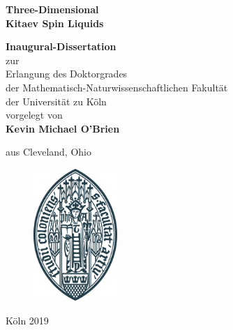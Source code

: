 \documentclass[11pt, a4paper]{article}
\begin{document}
\begin{titlepage}

	\vspace*{\fill}
	\begin{center}
		
		{\Huge\textbf{Three-Dimensional\\
				\vspace{0.5cm}
				Kitaev Spin Liquids}}\\
		\vspace{1.5cm}
	
		\doublespacing
		\textbf{Inaugural-Dissertation}\\
		zur\\
		Erlangung des Doktorgrades\\
		der Mathematisch-Naturwissenschaftlichen Fakult\"{a}t\\
		der Universit\"{a}t zu K\"{o}ln\\
		vorgelegt von\\
		
		\vspace{0.5cm}
		{\Large\textbf{Kevin Michael O'Brien}}\\
		\vspace{0.5cm}

		\normalsize
		aus Cleveland, Ohio\\

		\vspace{1.cm}		
		\begin{figure}[h!]
			\centering
			\includegraphics[height=5cm]{./titlePage/SiegelMatNat.pdf}
		\end{figure}
		\vspace{1.0cm}
				
		K\"{o}ln 2019
	\end{center}
	\vspace*{\fill}

\end{titlepage}
\end{document}
